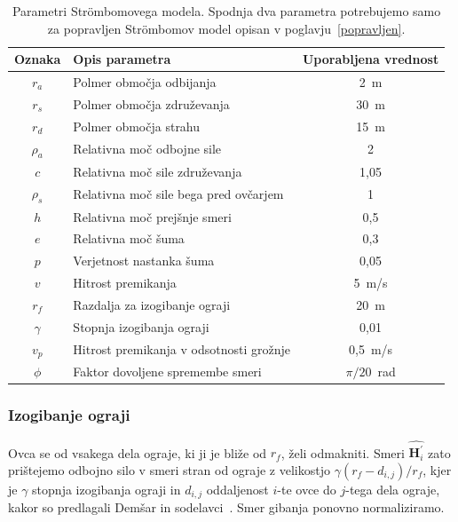 \begin{table}[ht]
	\begin{center}
		\begin{tabular}{ c|l|c }
		\hline
		\textbf{Oznaka} & \textbf{Opis parametra} & \textbf{Uporabljena vrednost} \\ \hline  
		$r_a$ & Polmer območja odbijanja & 2~m \\ 
		$r_s$ & Polmer območja združevanja & 30~m \\ 
		$r_d$ & Polmer območja strahu & 15~m \\ 
		$\rho_a$ & Relativna moč odbojne sile & 2 \\ 
		$c$ & Relativna moč sile združevanja & 1,05 \\ 
		$\rho_s$ & Relativna moč sile bega pred ovčarjem & 1 \\ 
		$h$ & Relativna moč prejšnje smeri & 0,5 \\ 
		$e$ & Relativna moč šuma & 0,3 \\ 
		$p$ & Verjetnost nastanka šuma & 0,05 \\ 
		$v$ & Hitrost premikanja & 5~m/s \\ 
		$r_f$ & Razdalja za izogibanje ograji & 20~m \\ 
		$\gamma$ & Stopnja izogibanja ograji & 0,01 \\ \hline
		$v_p$ & Hitrost premikanja v odsotnosti grožnje & 0,5~m/s \\ 
		$\phi$ & Faktor dovoljene spremembe smeri & $\pi / 20$~rad \\ 
		\hline
		\end{tabular}
	\end{center}
\caption[Parametri Str{\"o}mbomovega modela gibanja ovc]{Parametri Str{\"o}mbomovega modela. Spodnja dva parametra potrebujemo samo za popravljen Str{\"o}mbomov model opisan v poglavju~\ref{popravljen}.}
\label{table:stroembom}
\end{table}

\subsubsection{Izogibanje ograji}\label{ograja}

Ovca se od vsakega dela ograje, ki ji je bliže od $r_f$, želi odmakniti. Smeri $\hat{\mathbf{H}_i^\prime}$ zato prištejemo odbojno silo v smeri stran od ograje z velikostjo $\gamma (r_f - d_{i,j}) / r_f$, kjer je $\gamma$ stopnja izogibanja ograji in $d_{i,j}$ oddaljenost $i$-te ovce do $j$-tega dela ograje, kakor so predlagali Demšar in sodelavci~\cite{Demsar}. Smer gibanja ponovno normaliziramo.

